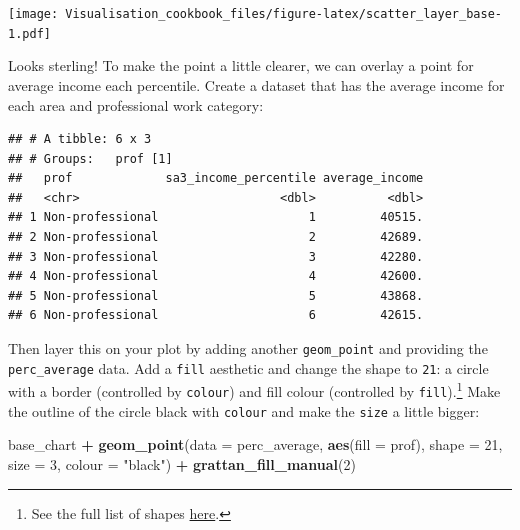 \documentclass[]{book}
\newenvironment{Shaded}{\begin{snugshade}}{\end{snugshade}}
\newcommand{\DataTypeTok}[1]{\textcolor[rgb]{0.13,0.29,0.53}{#1}}
\newcommand{\DecValTok}[1]{\textcolor[rgb]{0.00,0.00,0.81}{#1}}
\newcommand{\KeywordTok}[1]{\textcolor[rgb]{0.13,0.29,0.53}{\textbf{#1}}}
\newcommand{\NormalTok}[1]{#1}
\newcommand{\OperatorTok}[1]{\textcolor[rgb]{0.81,0.36,0.00}{\textbf{#1}}}
\newcommand{\StringTok}[1]{\textcolor[rgb]{0.31,0.60,0.02}{#1}}
\let\rmarkdownfootnote\footnote%
\def\footnote{\protect\rmarkdownfootnote}
\begin{document}
\texttt{[image: Visualisation\_cookbook\_files/figure-latex/scatter\_layer\_base-1.pdf]}

Looks sterling! To make the point a little clearer, we can overlay a point for average income each percentile. Create a dataset that has the average income for each area and professional work category:

\begin{Shaded}
\end{Shaded}

\begin{verbatim}
## # A tibble: 6 x 3
## # Groups:   prof [1]
##   prof             sa3_income_percentile average_income
##   <chr>                            <dbl>          <dbl>
## 1 Non-professional                     1         40515.
## 2 Non-professional                     2         42689.
## 3 Non-professional                     3         42280.
## 4 Non-professional                     4         42600.
## 5 Non-professional                     5         43868.
## 6 Non-professional                     6         42615.
\end{verbatim}

Then layer this on your plot by adding another \texttt{geom\_point} and providing the \texttt{perc\_average} data. Add a \texttt{fill} aesthetic and change the shape to \texttt{21}: a circle with a border (controlled by \texttt{colour}) and fill colour (controlled by \texttt{fill}).\footnote{See the full list of shapes \href{https://ggplot2.tidyverse.org/reference/scale_shape.html}{here}.}
Make the outline of the circle black with \texttt{colour} and make the \texttt{size} a little bigger:

\begin{Shaded}
\begin{Highlighting}[]
\NormalTok{base_chart }\OperatorTok{+}
\StringTok{  }\KeywordTok{geom_point}\NormalTok{(}\DataTypeTok{data =}\NormalTok{ perc_average,}
             \KeywordTok{aes}\NormalTok{(}\DataTypeTok{fill =}\NormalTok{ prof),}
             \DataTypeTok{shape =} \DecValTok{21}\NormalTok{,}
             \DataTypeTok{size =} \DecValTok{3}\NormalTok{, }
             \DataTypeTok{colour =} \StringTok{"black"}\NormalTok{) }\OperatorTok{+}\StringTok{ }
\StringTok{  }\KeywordTok{grattan_fill_manual}\NormalTok{(}\DecValTok{2}\NormalTok{)}
\end{Highlighting}
\end{Shaded}
\end{document}

